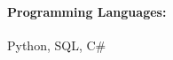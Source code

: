 \documentclass[10pt, letterpaper]{article}
\newenvironment{highlights}{
    \begin{itemize}[
        topsep=0.10 cm,
        parsep=0.10 cm,
        partopsep=0pt,
        itemsep=0pt,
        leftmargin=0 cm + 10pt
    ]
}{
    \end{itemize}
} %
\newenvironment{onecolentry}{
    \begin{adjustwidth}{
        0 cm + 0.00001 cm
    }{
        0 cm + 0.00001 cm
    }
}{
    \end{adjustwidth}
} %
\begin{document}
        \paragraph{Programming Languages:} Python, SQL, C\#

    
        



    
    
    


    
\end{document}
